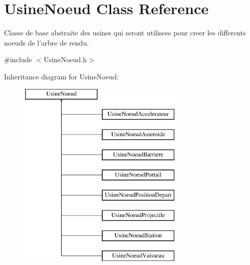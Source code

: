 \hypertarget{class_usine_noeud}{\section{Usine\-Noeud Class Reference}
\label{class_usine_noeud}
}


Classe de base abstraite des usines qui seront utilisees pour creer les differents noeuds de l'arbre de rendu.  




{\ttfamily \#include $<$Usine\-Noeud.\-h$>$}

Inheritance diagram for Usine\-Noeud\-:\begin{figure}[H]
\begin{center}
\leavevmode
\includegraphics[height=9.000000cm]{class_usine_noeud}
\end{center}
\end{figure}
